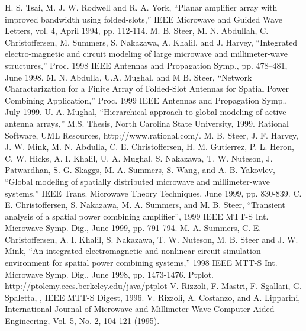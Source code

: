 \begin{thebibliography}{99}
%
 H. S. Tsai, M. J. W. Rodwell and R. A. York,
``Planar amplifier array with improved bandwidth using folded-slots,''
{IEEE Microwave and Guided Wave Letters}, vol. 4, April 1994,
pp. 112-114.
%
 M. B. Steer, M. N. Abdullah,
C. Christoffersen, M. Summers, S. Nakazawa, A. Khalil, and J.  Harvey,
``Integrated electro-magnetic and circuit modeling of large microwave
and millimeter-wave structures,''
{Proc. 1998 IEEE Antennas and Propagation Symp.},
pp. 478--481, June 1998.
%
 M. N. Abdulla, U.A. Mughal, and M B. Steer,
``Network Charactarization for a Finite Array of Folded-Slot Antennas
for Spatial Power Combining Application,''
{Proc. 1999 IEEE Antennas and Propagation Symp.},
July 1999.
%
 U. A. Mughal, ``Hierarchical approach to global
modeling of active antenna arrays,'' M.S. Thesis, North
Carolina State University, 1999.
%
Rational Software, UML Resources,
http://www.rational.com/.
%
%
M. B. Steer, J. F. Harvey, J. W. Mink, M. N. Abdulla, C. E. Christoffersen,
H. M. Gutierrez, P. L. Heron, C. W. Hicks, A. I. Khalil, U. A. Mughal,
S. Nakazawa, T. W. Nuteson, J. Patwardhan, S. G. Skaggs, M. A. Summers,
S. Wang, and A. B. Yakovlev, ``Global modeling of spatially distributed
microwave and millimeter-wave systems,'' {IEEE Trans. Microwave Theory
Techniques}, June 1999, pp. 830-839.
%
 C. E. Christoffersen, S. Nakazawa, M. A. Summers, and
M. B. Steer, ``Transient analysis of a spatial power combining
amplifier'', {1999 IEEE MTT-S Int. Microwave Symp. Dig.}, June
1999, pp. 791-794.
%
 M. A. Summers, C. E. Christoffersen, A. I. Khalil,
S. Nakazawa, T. W. Nuteson, M. B. Steer and J. W. Mink, ``An
integrated electromagnetic and nonlinear circuit simulation
environment for spatial power combining systems,'' {1998 IEEE MTT-S
Int. Microwave Symp. Dig.}, June 1998, pp. 1473-1476.
%
 Ptplot. http://ptolemy.eecs.berkeley.edu/java/ptplot
%
%
V. Rizzoli, F. Mastri, F. Sgallari,
G. Spaletta, , \newblock IEEE MTT-S Digest, 1996.
%
V. Rizzoli, A. Costanzo, and A. Lipparini,
 \newblock International Journal of
Microwave and Millimeter-Wave Computer-Aided Engineering, Vol. 5,
No. 2, 104-121 (1995).
%

\end{thebibliography}
